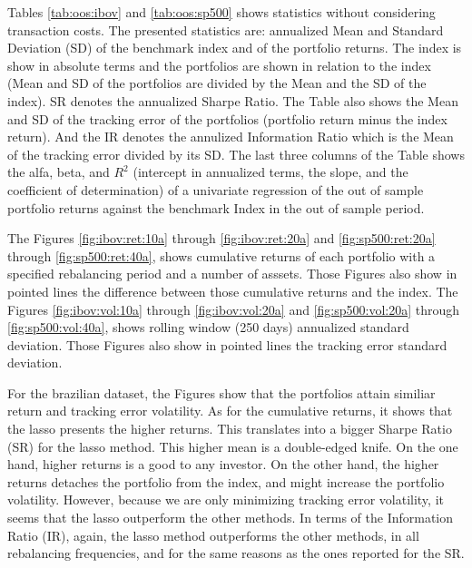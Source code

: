 \documentclass[preprint, doubleblind, authoryear,10pt]{elsarticle}
\begin{document}

Tables \ref{tab:oos:ibov} and \ref{tab:oos:sp500} shows statistics without considering transaction costs.
The presented statistics are: annualized Mean and Standard Deviation (SD) of the benchmark index and of the portfolio returns.
The index is show in absolute terms and the portfolios are shown in relation to the index (Mean and SD of the portfolios are divided by the Mean and the SD of the index).
SR denotes the annualized Sharpe Ratio.
The Table also shows the Mean and SD of the tracking error of the portfolios (portfolio return minus the index return).
And the IR denotes the annulized Information Ratio which is the Mean of the tracking error divided by its SD.
The last three columns of the Table shows the alfa, beta, and $R^2$ (intercept in annualized terms, the slope, and the coefficient of determination) of a univariate regression of the out of sample portfolio returns against the benchmark Index in the out of sample period.

The Figures \ref{fig:ibov:ret:10a} through \ref{fig:ibov:ret:20a} and \ref{fig:sp500:ret:20a} through \ref{fig:sp500:ret:40a}, shows cumulative returns of each portfolio with a specified rebalancing period and a number of asssets.
Those Figures also show in pointed lines the difference between those cumulative returns and the index.
The Figures \ref{fig:ibov:vol:10a} through \ref{fig:ibov:vol:20a} and \ref{fig:sp500:vol:20a} through \ref{fig:sp500:vol:40a}, shows rolling window (250 days) annualized standard deviation.
Those Figures also show in pointed lines the tracking error standard deviation.

For the brazilian dataset, the Figures show that the portfolios attain similiar return and tracking error volatility.
As for the cumulative returns, it shows that the lasso presents the higher returns.
This translates into a bigger Sharpe Ratio (SR) for the lasso method.
This higher mean is a double-edged knife.
On the one hand, higher returns is a good to any investor.
On the other hand, the higher returns detaches the portfolio from the index, and might increase the portfolio volatility.
However, because we are only minimizing tracking error volatility, it seems that the lasso outperform the other methods.
In terms of the Information Ratio (IR), again, the lasso method outperforms the other methods, in all rebalancing frequencies, and for the same reasons as the ones reported for the SR.
\end{document}
